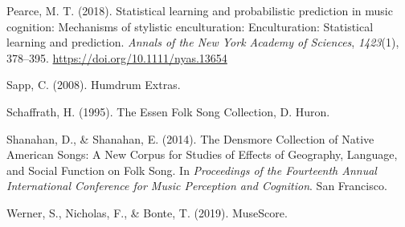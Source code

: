 \documentclass[english,man,floatsintext]{apa6}
\begin{document}
\leavevmode\hypertarget{ref-pearceStatisticalLearningProbabilistic2018a}{}%
Pearce, M. T. (2018). Statistical learning and probabilistic prediction in music cognition: Mechanisms of stylistic enculturation: Enculturation: Statistical learning and prediction. \emph{Annals of the New York Academy of Sciences}, \emph{1423}(1), 378--395. \url{https://doi.org/10.1111/nyas.13654}

\leavevmode\hypertarget{ref-sappHumdrumExtras2008}{}%
Sapp, C. (2008). Humdrum Extras.

\leavevmode\hypertarget{ref-schaffrathEssenFolkSong1995}{}%
Schaffrath, H. (1995). The Essen Folk Song Collection, D. Huron.

\leavevmode\hypertarget{ref-shanahanDensmoreCollectionNative2014}{}%
Shanahan, D., \& Shanahan, E. (2014). The Densmore Collection of Native American Songs: A New Corpus for Studies of Effects of Geography, Language, and Social Function on Folk Song. In \emph{Proceedings of the Fourteenth Annual International Conference for Music Perception and Cognition}. San Francisco.

\leavevmode\hypertarget{ref-wernerMuseScore2019}{}%
Werner, S., Nicholas, F., \& Bonte, T. (2019). MuseScore.

\endgroup
\end{document}
